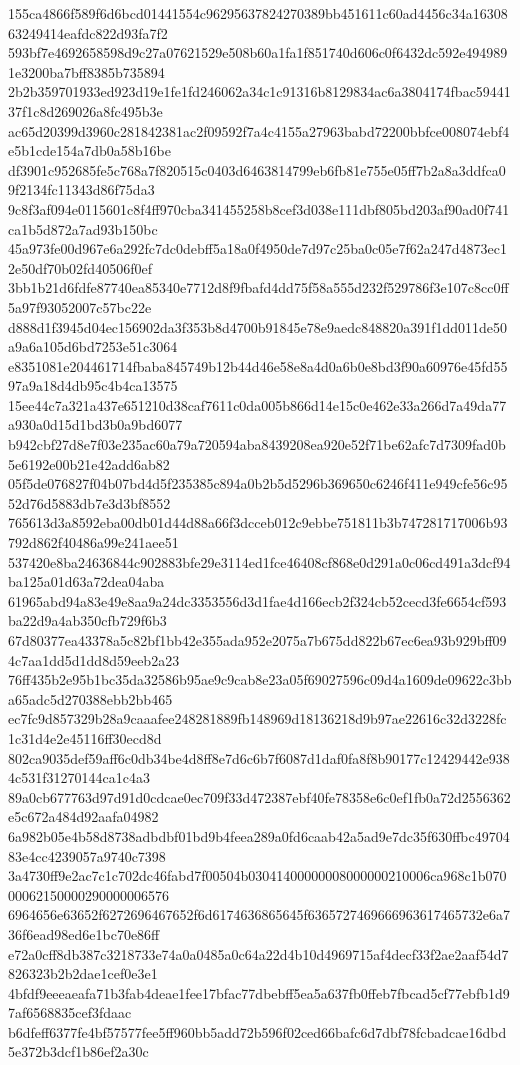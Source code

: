 {155ca4866f589f6d6bcd01441554c96295637824270389bb451611c60ad4456c34a1630863249414eafdc822d93fa7f2
593bf7e4692658598d9c27a07621529e508b60a1fa1f851740d606c0f6432dc592e4949891e3200ba7bff8385b735894
2b2b359701933ed923d19e1fe1fd246062a34c1c91316b8129834ac6a3804174fbac5944137f1c8d269026a8fc495b3e
ac65d20399d3960c281842381ac2f09592f7a4c4155a27963babd72200bbfce008074ebf4e5b1cde154a7db0a58b16be
df3901c952685fe5c768a7f820515c0403d6463814799eb6fb81e755e05ff7b2a8a3ddfca09f2134fc11343d86f75da3
9c8f3af094e0115601c8f4ff970cba341455258b8cef3d038e111dbf805bd203af90ad0f741ca1b5d872a7ad93b150bc
45a973fe00d967e6a292fc7dc0debff5a18a0f4950de7d97c25ba0c05e7f62a247d4873ec12e50df70b02fd40506f0ef
3bb1b21d6fdfe87740ea85340e7712d8f9fbafd4dd75f58a555d232f529786f3e107c8cc0ff5a97f93052007c57bc22e
d888d1f3945d04ec156902da3f353b8d4700b91845e78e9aedc848820a391f1dd011de50a9a6a105d6bd7253e51c3064
e8351081e204461714fbaba845749b12b44d46e58e8a4d0a6b0e8bd3f90a60976e45fd5597a9a18d4db95c4b4ca13575
15ee44c7a321a437e651210d38caf7611c0da005b866d14e15c0e462e33a266d7a49da77a930a0d15d1bd3b0a9bd6077
b942cbf27d8e7f03e235ac60a79a720594aba8439208ea920e52f71be62afc7d7309fad0b5e6192e00b21e42add6ab82
05f5de076827f04b07bd4d5f235385c894a0b2b5d5296b369650c6246f411e949cfe56c9552d76d5883db7e3d3bf8552
765613d3a8592eba00db01d44d88a66f3dcceb012c9ebbe751811b3b747281717006b93792d862f40486a99e241aee51
537420e8ba24636844c902883bfe29e3114ed1fce46408cf868e0d291a0c06cd491a3dcf94ba125a01d63a72dea04aba
61965abd94a83e49e8aa9a24dc3353556d3d1fae4d166ecb2f324cb52cecd3fe6654cf593ba22d9a4ab350cfb729f6b3
67d80377ea43378a5c82bf1bb42e355ada952e2075a7b675dd822b67ec6ea93b929bff094c7aa1dd5d1dd8d59eeb2a23
76ff435b2e95b1bc35da32586b95ae9c9cab8e23a05f69027596c09d4a1609de09622c3bba65adc5d270388ebb2bb465
ec7fc9d857329b28a9caaafee248281889fb148969d18136218d9b97ae22616c32d3228fc1c31d4e2e45116ff30ecd8d
802ca9035def59aff6c0db34be4d8ff8e7d6c6b7f6087d1daf0fa8f8b90177c12429442e9384c531f31270144ca1c4a3
89a0cb677763d97d91d0cdcae0ec709f33d472387ebf40fe78358e6c0ef1fb0a72d2556362e5c672a484d92aafa04982
6a982b05e4b58d8738adbdbf01bd9b4feea289a0fd6caab42a5ad9e7dc35f630ffbc4970483e4cc4239057a9740c7398
3a4730ff9e2ac7c1c702dc46fabd7f00504b03041400000008000000210006ca968c1b07000062150000290000006576
6964656e63652f6272696467652f6d6174636865645f6365727469666963617465732e6a736f6ead98ed6e1bc70e86ff
e72a0cff8db387c3218733e74a0a0485a0c64a22d4b10d4969715af4decf33f2ae2aaf54d7826323b2b2dae1cef0e3e1
4bfdf9eeeaeafa71b3fab4deae1fee17bfac77dbebff5ea5a637fb0ffeb7fbcad5cf77ebfb1d97af6568835cef3fdaac
b6dfeff6377fe4bf57577fee5ff960bb5add72b596f02ced66bafc6d7dbf78fcbadcae16dbd5e372b3dcf1b86ef2a30c
}
